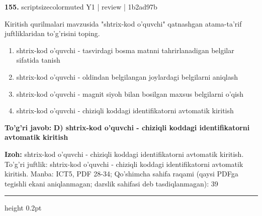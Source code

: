 \documentclass[10pt,a4paper]{article}
\begin{document}
{\bfseries\sffamily\color{ink} 155.} {scriptsizecolor{muted} Y1 | review | 1b2ad97b}
\par
Kiritish qurilmalari mavzusida "shtrix-kod o'quvchi" qatnashgan atama-ta'rif juftliklaridan to'g'risini toping.
\begin{enumerate}[label=\Alph*),leftmargin=9mm]
\item shtrix-kod o'quvchi - tasvirdagi bosma matnni tahrirlanadigan belgilar sifatida tanish
\item shtrix-kod o'quvchi - oldindan belgilangan joylardagi belgilarni aniqlash
\item shtrix-kod o'quvchi - magnit siyoh bilan bosilgan maxsus belgilarni o'qish
\item shtrix-kod o'quvchi - chiziqli koddagi identifikatorni avtomatik kiritish
\end{enumerate}
\begin{tcolorbox}[enhanced,breakable,colback=teal!4,colframe=teal!60!black,boxrule=0.45pt,arc=1.2mm,left=2.7mm,right=2.7mm,top=1.8mm,bottom=1.8mm,before skip=2mm,after skip=2mm]
{\bfseries\sffamily\color{teal}To'g'ri javob:} \textbf{D) shtrix-kod o'quvchi - chiziqli koddagi identifikatorni avtomatik kiritish}
\par\smallskip
{\bfseries Izoh:} shtrix-kod o'quvchi - chiziqli koddagi identifikatorni avtomatik kiritish. To'g'ri juftlik: shtrix-kod o'quvchi - chiziqli koddagi identifikatorni avtomatik kiritish. Manba: ICT5, PDF 28-34; Qo'shimcha sahifa raqami (qaysi PDFga tegishli ekani aniqlanmagan; darslik sahifasi deb tasdiqlanmagan): 39
\end{tcolorbox}
\vspace{2mm}\hrule height 0.2pt\vspace{3mm}
\end{document}
